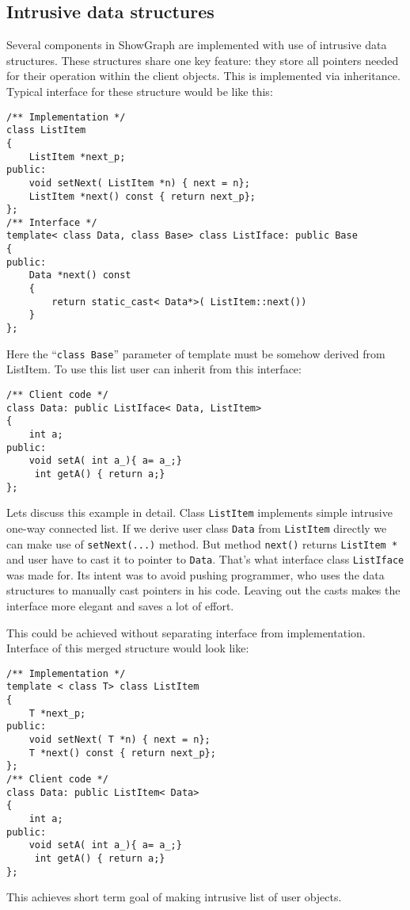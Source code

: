 \documentclass[11pt,a4paper]{article}
\begin{document}
\subsection{Intrusive data structures}
Several components in ShowGraph are implemented with use of intrusive data structures. These structures share one key feature: they store all pointers needed for their operation within the client objects. This is implemented via inheritance. Typical interface for these structure would be like this:
\begin{lstlisting}
/** Implementation */
class ListItem
{
    ListItem *next_p;
public:
    void setNext( ListItem *n) { next = n};
    ListItem *next() const { return next_p};
};
/** Interface */
template< class Data, class Base> class ListIface: public Base
{
public:
    Data *next() const
    {
        return static_cast< Data*>( ListItem::next())
    }
};
\end{lstlisting}
Here the ``\lstinline{class Base}'' parameter of template must be somehow derived from ListItem. To use this list user can inherit from this interface:
\begin{lstlisting}
/** Client code */
class Data: public ListIface< Data, ListItem> 
{
    int a;
public:
    void setA( int a_){ a= a_;}
	 int getA() { return a;}
};
\end{lstlisting}
Lets discuss this example in detail. Class \lstinline{ListItem} implements simple intrusive one-way connected list. If we derive user class \lstinline{Data} from \lstinline{ListItem} directly we can make use of \lstinline{setNext(...)} method. But method \lstinline{next()} returns \lstinline{ListItem *} and user have to cast it to pointer to \lstinline{Data}. That's what interface class \lstinline{ListIface} was made for. Its intent was to avoid pushing programmer, who uses the data structures to manually cast pointers in his code. Leaving out the casts makes the interface more elegant and saves a lot of effort. 

This could be achieved without separating interface from implementation. Interface of this merged structure would look like:
\begin{lstlisting}
/** Implementation */
template < class T> class ListItem
{
    T *next_p;
public:
    void setNext( T *n) { next = n};
    T *next() const { return next_p};
};
/** Client code */
class Data: public ListItem< Data> 
{
    int a;
public:
    void setA( int a_){ a= a_;}
	 int getA() { return a;}
};
\end{lstlisting}
This achieves short term goal of making intrusive list of user objects. 
\end{document}
